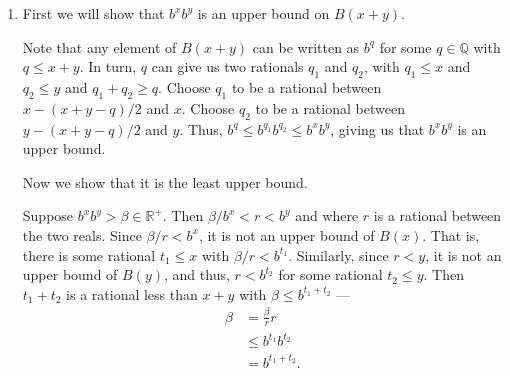 \documentclass[12 pt, letterpaper]{hmcpset}
\begin{document}
\begin{solution}
\begin{enumerate}
			Any element of $B(r)$ is of the form $b^{t}$ for some rational $t \le r$. We can write $b^{r} = b^{t} b^{r - t}$ where $r - t$ is some nonnegative rational. Since $b > 1$, $b^{r - t} \ge 1$, and thus, $b^{r} \ge b^{t}$. Thus, $b^{r}$ is an upper bound on $B(r)$. 
			
			Now we will show that it is the least upper bound. 

			Suppose $b^{r} > \beta \in \mathbb{R}$. Then $\beta$ is less than an element of  $B(r)$ --- $b^{r}$ itself, and thus, is not an upper bound. That is, no real less than $b^{r}$ can be an upper bound of $B(r)$ --- $b^{r}$ is the least upper bound of $B(r)$.
		\item First we will show that $b^x b^{y}$ is an upper bound on $B(x + y)$. 

			Note that any element of $B(x + y)$ can be written as $b^{q}$ for some $q \in \mathbb{Q}$ with $q \le x + y$. In turn, $q$ can give us two rationals $q_{1}$ and $q_{2}$, with $q_{1} \le x$ and $q_{2} \le y$ and $q_{1} + q_{2} \ge q$. Choose $q_{1}$ to be a rational between $x - (x + y - q)/2$ and $x$. Choose $q_{2}$ to be a rational between $y - (x + y - q)/2$ and $y$. Thus, $b^{q} \le b^{q_{1}} b^{q_{2}} \le b^{x} b^{y}$, giving us that $b^{x} b^{y}$ is an upper bound. 

			Now we show that it is the least upper bound. 

			Suppose $b^{x} b^{y} > \beta \in \mathbb{R}^{+}$. Then $\beta/b^{x} < r < b^{y}$ and where $r$ is a rational between the two reals. Since $\beta/r < b^{x}$, it is not an upper bound of $B(x)$. That is, there is some rational $t_{1} \le x$ with $\beta/r < b^{t_{1}}$. Similarly, since $r < y$, it is not an upper bound of $B(y)$, and thus, $r < b^{t_{2}}$ for some rational $t_{2} \le y$. Then $t_{1} + t_{2}$ is a rational less than $x + y$ with $\beta \le b^{t_{1} + t_{2}}$ ---
			\[
				\begin{split}
					\beta & = \frac{\beta}{r} r \\
					      & \le b^{t_{1}} b^{t_{2}} \\
					      & = b^{t_{1} + t_{2}}.
				\end{split}
			\]
	\end{enumerate}
\end{solution}

\pagebreak
\end{document}
